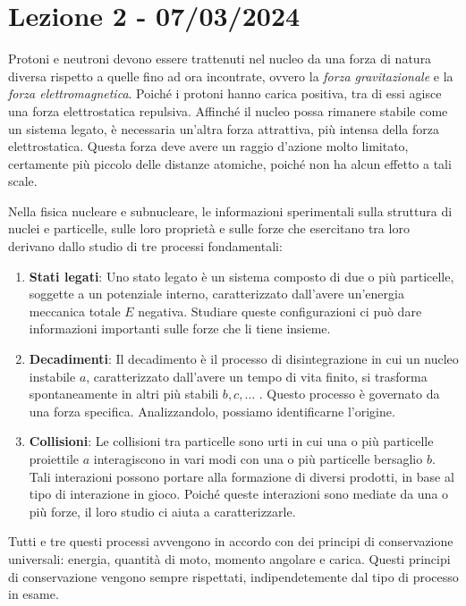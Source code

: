 \section{Lezione 2 - 07/03/2024}


Protoni e neutroni devono essere trattenuti nel nucleo da una forza di natura diversa rispetto a quelle fino ad ora incontrate, ovvero la \textit{forza gravitazionale} e la \textit{forza elettromagnetica}. Poiché i protoni hanno carica positiva, tra di essi agisce una forza elettrostatica repulsiva. Affinché il nucleo possa rimanere stabile come un sistema legato, è necessaria un'altra forza attrattiva, più intensa della forza elettrostatica. Questa forza deve avere un raggio d'azione molto limitato, certamente più piccolo delle distanze atomiche, poiché non ha alcun effetto a tali scale. 

Nella fisica nucleare e subnucleare, le informazioni sperimentali sulla struttura di nuclei e particelle, sulle loro proprietà e sulle forze che esercitano tra loro derivano dallo studio di tre processi fondamentali: 
    \begin{enumerate}
        \item \textbf{Stati legati}: Uno stato legato è un sistema composto di due o più particelle, soggette a un potenziale interno, caratterizzato dall'avere un'energia meccanica totale $E$ negativa. Studiare queste configurazioni ci può dare informazioni importanti sulle forze che li tiene insieme.
        \item \textbf{Decadimenti}: Il decadimento è il processo di disintegrazione in cui un nucleo instabile $a$, caratterizzato dall'avere un tempo di vita finito, si trasforma spontaneamente in altri più stabili $b, c, \dots$ . Questo processo è governato da una forza specifica. Analizzandolo, possiamo identificarne l'origine. 
        \item \textbf{Collisioni}: Le collisioni tra particelle sono urti in cui una o più particelle proiettile $a$ interagiscono in vari modi con una o più particelle bersaglio $b$. Tali interazioni possono portare alla formazione di diversi prodotti, in base al tipo di interazione in gioco. Poiché queste interazioni sono mediate da una o più forze, il loro studio ci aiuta a caratterizzarle.
    \end{enumerate}
Tutti e tre questi processi avvengono in accordo con dei principi di conservazione universali: energia, quantità di moto, momento angolare e carica. Questi principi di conservazione vengono sempre rispettati, indipendetemente dal tipo di processo in esame. 

